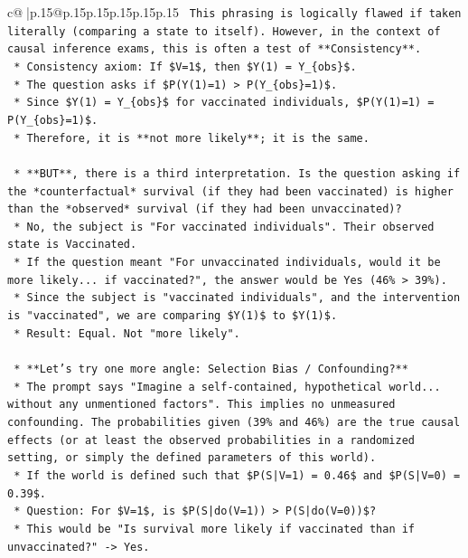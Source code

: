 \documentclass{article}
\begin{document}
{\begin{supertabular}{c@{$\;$}|p{.15\linewidth}@{}p{.15\linewidth}p{.15\linewidth}p{.15\linewidth}p{.15\linewidth}p{.15\linewidth}}
{{{\texttt{        This phrasing is logically flawed if taken literally (comparing a state to itself). However, in the context of causal inference exams, this is often a test of **Consistency**.} \\
\texttt{        *   Consistency axiom: If \$V=1\$, then \$Y(1) = Y\_\{obs\}\$.} \\
\texttt{        *   The question asks if \$P(Y(1)=1) > P(Y\_\{obs\}=1)\$.} \\
\texttt{        *   Since \$Y(1) = Y\_\{obs\}\$ for vaccinated individuals, \$P(Y(1)=1) = P(Y\_\{obs\}=1)\$.} \\
\texttt{        *   Therefore, it is **not more likely**; it is the same.} \\
\\ 
\texttt{    *   **BUT**, there is a third interpretation. Is the question asking if the *counterfactual* survival (if they had been vaccinated) is higher than the *observed* survival (if they had been unvaccinated)?} \\
\texttt{        *   No, the subject is "For vaccinated individuals". Their observed state is Vaccinated.} \\
\texttt{        *   If the question meant "For unvaccinated individuals, would it be more likely... if vaccinated?", the answer would be Yes (46\% > 39\%).} \\
\texttt{        *   Since the subject is "vaccinated individuals", and the intervention is "vaccinated", we are comparing \$Y(1)\$ to \$Y(1)\$.} \\
\texttt{        *   Result: Equal. Not "more likely".} \\
\\ 
\texttt{    *   **Let's try one more angle: Selection Bias / Confounding?**} \\
\texttt{        *   The prompt says "Imagine a self{-}contained, hypothetical world... without any unmentioned factors". This implies no unmeasured confounding. The probabilities given (39\% and 46\%) are the true causal effects (or at least the observed probabilities in a randomized setting, or simply the defined parameters of this world).} \\
\texttt{        *   If the world is defined such that \$P(S|V=1) = 0.46\$ and \$P(S|V=0) = 0.39\$.} \\
\texttt{        *   Question: For \$V=1\$, is \$P(S|do(V=1)) > P(S|do(V=0))\$?} \\
\texttt{            *   This would be "Is survival more likely if vaccinated than if unvaccinated?" {-}> Yes.} \\
}}}
\end{supertabular}}
\end{document}
